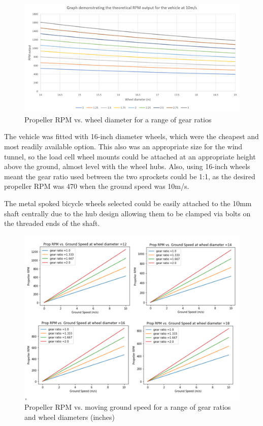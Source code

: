 \begin{figure}[!htbp]
    \centering
    \includegraphics{images/part9/propRPM.png}
    \caption{Propeller RPM vs. wheel diameter for a range of gear ratios}
    \label{fig:propRPM}
\end{figure}

The vehicle was fitted with 16-inch diameter wheels, which were the cheapest and most readily available option. This also was an appropriate size for the wind tunnel, so the load cell wheel mounts could be attached at an appropriate height above the ground, almost level with the wheel hubs. Also, using 16-inch wheels meant the gear ratio used between the two sprockets could be 1:1, as the desired propeller RPM was 470 when the ground speed was 10m/s.

The metal spoked bicycle wheels selected could be easily attached to the 10mm shaft centrally due to the hub design allowing them to be clamped via bolts on the threaded ends of the shaft.

\begin{figure}[!htbp]
    \centering
    \includegraphics[width = 0.7\linewidth]{images/part9/propRPM2.png}
    \caption{Propeller RPM vs. moving ground speed for a range of gear ratios and wheel diameters (inches)}
    \label{fig:propRPM2}
\end{figure}

